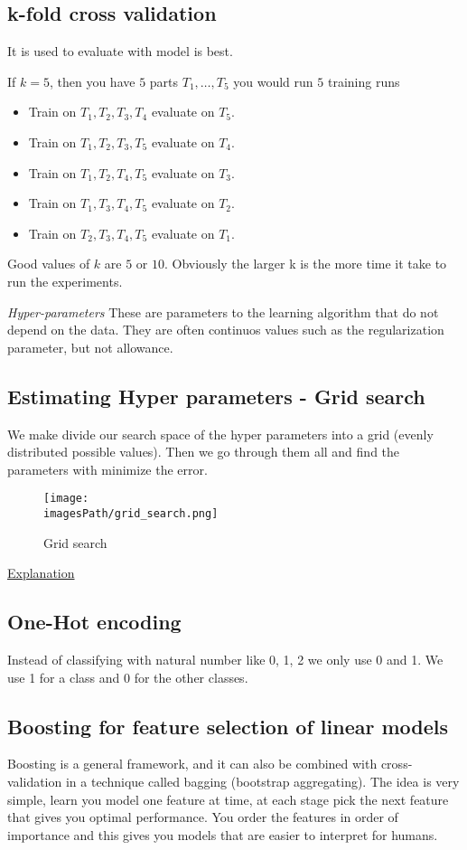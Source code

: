 \documentclass{article}
\newcommand{\imagesPath}{images}
\begin{document}
\subsection{k-fold cross validation}
It is used to evaluate with model is best.

If $k = 5$, then you have $5$ parts $T_1,\ldots,T_5$ you would run $5$ training runs
\begin{itemize}
    \item Train on $T_1, T_2, T_3, T_4$ evaluate on $T_5$.
    \item Train on $T_1, T_2, T_3, T_5$ evaluate on $T_4$.
    \item Train on $T_1, T_2, T_4, T_5$ evaluate on $T_3$.
    \item Train on $T_1, T_3, T_4, T_5$ evaluate on $T_2$.
    \item Train on $T_2, T_3, T_4, T_5$ evaluate on $T_1$.
\end{itemize}
Good values of $k$ are $5$ or $10$. Obviously the larger k is the more time it take to run the experiments.

\textit{Hyper-parameters} \newline
These are parameters to the learning algorithm that do not depend on the data.
They are often continuos values such as the regularization parameter, but not allowance.

\subsection{Estimating Hyper parameters - Grid search}
We make divide our search space of the hyper parameters into a grid (evenly distributed possible values).
Then we go through them all and find the parameters with minimize the error.
\begin{figure}[!h]
    \centering
    \texttt{[image: \\imagesPath/grid\_search.png]}
    \caption{Grid search}
\end{figure}
\href{https://www.youtube.com/watch?v=ttE0F7fghfk}{Explanation}


\subsection{One-Hot encoding}
Instead of classifying with natural number like 0, 1, 2 we only 
use 0 and 1. We use 1 for a class and 0 for the other classes.

\subsection{Boosting for feature selection of linear models}
Boosting is a general framework, and it can also be combined with
cross-validation in a technique called bagging (bootstrap aggregating).
The idea is very simple, learn you model one feature at time, at each stage
pick the next feature that gives you optimal performance.
You order the features in order of importance and this gives you models
that are easier to interpret for humans.
\end{document}
